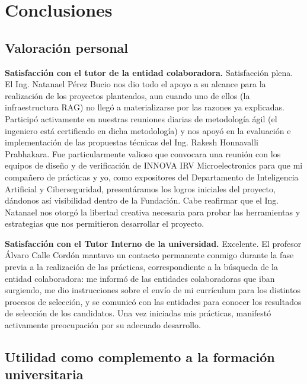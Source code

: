 \chapter{Conclusiones}

\section{Valoración personal}

\textbf{Satisfacción con el tutor de la entidad colaboradora.} Satisfacción plena. El Ing. Natanael Pérez Bucio nos dio todo el apoyo a su alcance para la realización de los proyectos planteados, aun cuando uno de ellos (la infraestructura RAG) no llegó a materializarse por las razones ya explicadas. Participó activamente en nuestras reuniones diarias de metodología ágil (el ingeniero está certificado en dicha metodología) y nos apoyó en la evaluación e implementación de las propuestas técnicas del Ing. Rakesh Honnavalli Prabhakara. Fue particularmente valioso que convocara una reunión con los equipos de diseño y de verificación de INNOVA IRV Microelectronics para que mi compañero de prácticas y yo, como expositores del Departamento de Inteligencia Artificial y Ciberseguridad, presentáramos los logros iniciales del proyecto, dándonos así visibilidad dentro de la Fundación. Cabe reafirmar que el Ing. Natanael nos otorgó la libertad creativa necesaria para probar las herramientas y estrategias que nos permitieron desarrollar el proyecto.

\textbf{Satisfacción con el Tutor Interno de la universidad.} Excelente. El profesor Álvaro Calle Cordón mantuvo un contacto permanente conmigo durante la fase previa a la realización de las prácticas, correspondiente a la búsqueda de la entidad colaboradora: me informó de las entidades colaboradoras que iban surgiendo, me dio instrucciones sobre el envío de mi currículum para los distintos procesos de selección, y se comunicó con las entidades para conocer los resultados de selección de los candidatos. Una vez iniciadas mis prácticas, manifestó activamente preocupación por su adecuado desarrollo.

\section{Utilidad como complemento a la formación universitaria}


